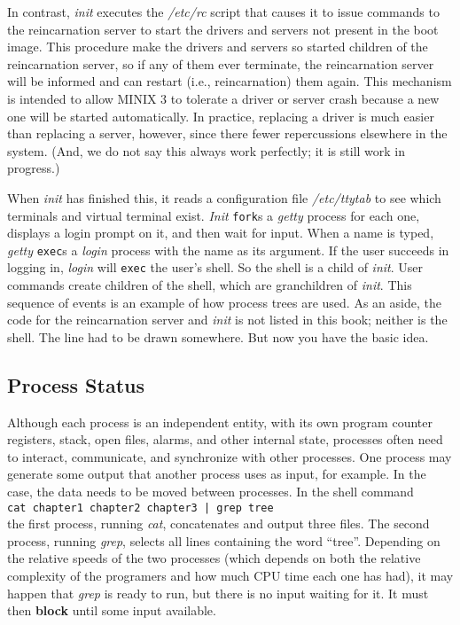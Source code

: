 \documentclass{book}
\newcommand {\kw}  [1] {\textbf{#1}}
\newcommand {\sys} [1] {\textsl{#1}}
\newcommand {\cmd} [1] {\texttt{#1}}
\begin{document}
In contrast, \sys{init} executes the \sys{/etc/rc} script that causes it to issue commands to the reincarnation server
to start the drivers and servers not present in the boot image.
This procedure make the drivers and servers so started children of the reincarnation server,
so if any of them ever terminate, the reincarnation server will be informed and can restart (i.e., reincarnation) them again.
This mechanism is intended to allow MINIX 3 to tolerate a driver or server crash because a new one will be started automatically.
In practice, replacing a driver is much easier than replacing a server, however,
since there fewer repercussions elsewhere in the system.
(And, we do not say this always work perfectly; it is still work in progress.)

When \sys{init} has finished this, it reads a configuration file \sys{/etc/ttytab} to see which terminals and virtual terminal exist.
\sys{Init} \cmd{fork}s a \sys{getty} process for each one, displays a login prompt on it, and then wait for input.
When a name is typed, \sys{getty} \cmd{exec}s a \sys{login} process with the name as its argument.
If the user succeeds in logging in, \sys{login} will \cmd{exec} the user's shell.
So the shell is a child of \sys{init}.
User commands create children of the shell, which are granchildren of \sys{init}.
This sequence of events is an example of how process trees are used.
As an aside, the code for the reincarnation server and \sys{init} is not listed in this book; neither is the shell.
The line had to be drawn somewhere.
But now you have the basic idea.

\subsection{Process Status}
Although each process is an independent entity, 
with its own program counter registers, stack, open files, alarms, and other internal state,
processes often need to interact, communicate, and synchronize with other processes.
One process may generate some output that another process uses as input, for example.
In the case, the data needs to be moved between processes.
In the shell command\\
\cmd{cat chapter1 chapter2 chapter3 | grep tree}\\
the first process, running \sys{cat}, concatenates and output three files.
The second process, running \sys{grep}, selects all lines containing the word ``tree''.
Depending on the relative speeds of the two processes (which depends on both 
the relative complexity of the programers and how much CPU time each one has had),
it may happen that \sys{grep} is ready to run, but there is no input waiting for it.
It must then \kw{block} until some input available.
\end{document}
